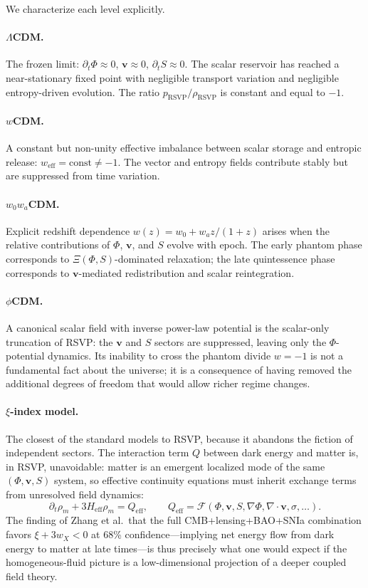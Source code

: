 \documentclass[12pt,a4paper]{article}
\theoremstyle{remark}
\newcommand{\vv}{\mathbf{v}}
\newcommand{\Heff}{H_{\mathrm{eff}}}
\newcommand{\rhoRSVP}{\rho_{\mathrm{RSVP}}}
\newcommand{\pRSVP}{p_{\mathrm{RSVP}}}
\newcommand{\weff}{w_{\mathrm{eff}}}
\begin{document}
We characterize each level explicitly.

\paragraph{$\Lambda$CDM.} The frozen limit: $\partial_t \Phi \approx 0$, $\vv \approx 0$, $\partial_t S \approx 0$. The scalar reservoir has reached a near-stationary fixed point with negligible transport variation and negligible entropy-driven evolution. The ratio $\pRSVP / \rhoRSVP$ is constant and equal to $-1$.

\paragraph{$w$CDM.} A constant but non-unity effective imbalance between scalar storage and entropic release: $\weff = \mathrm{const} \ne -1$. The vector and entropy fields contribute stably but are suppressed from time variation.

\paragraph{$w_0 w_a$CDM.} Explicit redshift dependence $w(z) = w_0 + w_a z/(1+z)$ arises when the relative contributions of $\Phi$, $\vv$, and $S$ evolve with epoch. The early phantom phase corresponds to $\Xi(\Phi, S)$-dominated relaxation; the late quintessence phase corresponds to $\vv$-mediated redistribution and scalar reintegration.

\paragraph{$\phi$CDM.} A canonical scalar field with inverse power-law potential is the scalar-only truncation of RSVP: the $\vv$ and $S$ sectors are suppressed, leaving only the $\Phi$-potential dynamics. Its inability to cross the phantom divide $w = -1$ is not a fundamental fact about the universe; it is a consequence of having removed the additional degrees of freedom that would allow richer regime changes.

\paragraph{$\xi$-index model.} The closest of the standard models to RSVP, because it abandons the fiction of independent sectors. The interaction term $Q$ between dark energy and matter is, in RSVP, unavoidable: matter is an emergent localized mode of the same $(\Phi, \vv, S)$ system, so effective continuity equations must inherit exchange terms from unresolved field dynamics:
\begin{equation}
\partial_t \rho_m + 3\Heff \rho_m = Q_{\mathrm{eff}},
\qquad
Q_{\mathrm{eff}} = \mathcal{F}(\Phi, \vv, S, \nabla\Phi, \nabla\cdot\vv, \sigma, \ldots).
\end{equation}
The finding of Zhang et al.\ that the full CMB+lensing+BAO+SNIa combination favors $\xi + 3w_X < 0$ at 68\% confidence---implying net energy flow from dark energy to matter at late times---is thus precisely what one would expect if the homogeneous-fluid picture is a low-dimensional projection of a deeper coupled field theory.
\end{document}
